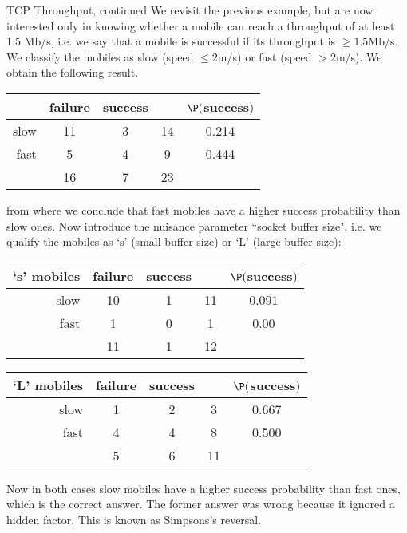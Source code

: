 \begin{ex}{TCP Throughput, continued}\label{ex-simpson}
We revisit the previous example, but are now interested only in
knowing whether a mobile can reach a throughput of at least 1.5
Mb/s, i.e.  we say that a mobile is successful if its throughput is
$\geq 1.5$Mb/s. We classify the mobiles as slow (speed $\leq 2 $m/s)
or fast (speed $> 2$m/s). We obtain the following result.
\begin{center}
 \begin{tabular}{|r|c|c|c|c|}
   \hline
      & failure  & success &   & $\P($success$)$ \\ \hline
   \hline
   slow & 11 & 3 & 14 & 0.214 \\
   fast & 5 & 4 & 9 & 0.444 \\
   \hline
    &  16 & 7 & 23 &   \\
   \hline
 \end{tabular}
\end{center}
from where we conclude that fast mobiles have a higher success
probability than slow ones. Now introduce the nuisance parameter
``socket buffer size", i.e. we qualify the mobiles as `s' (small
buffer size) or `L' (large buffer size):
\begin{center}
 \begin{tabular}{|r|c|c|c|c|}
   \hline
    `s' mobiles  & failure  & success &   & $\P($success$)$ \\ \hline
   \hline
   slow & 10 & 1 & 11 & 0.091 \\
   fast & 1 & 0 & 1 & 0.00 \\
   \hline
    &  11 & 1 & 12 &   \\
   \hline
 \end{tabular}

 \begin{tabular}{|r|c|c|c|c|}
   \hline
    `L' mobiles  & failure  & success &   & $\P($success$)$ \\ \hline
   \hline
   slow & 1 & 2 & 3 & 0.667 \\
   fast & 4 & 4 & 8 & 0.500 \\
   \hline
    &  5 & 6 & 11 &   \\
   \hline
 \end{tabular}
 \end{center}

Now in both cases slow mobiles have a higher success probability
than fast ones, which is the correct answer. The former answer was
wrong because it ignored a hidden factor. This is known as
Simpsons's reversal.
\end{ex}

